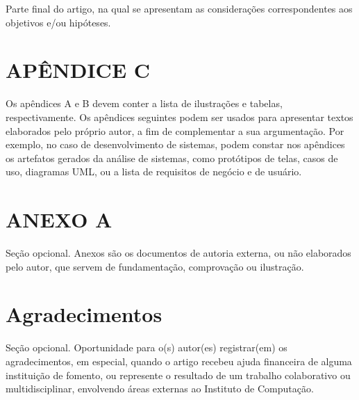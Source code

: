 \documentclass[article,a4paper,12pt,brazil,sumario=tradicional]{abntex2}
\begin{document}
Parte final do artigo, na qual se apresentam as considerações correspondentes aos objetivos e/ou hipóteses.

\newpage


\newpage
\renewcommand{\listfigurename}{APÊNDICE A - Lista de ilustrações}
\listoffigures

\newpage
\renewcommand{\listtablename}{APÊNDICE B - Lista de tabelas}
\listoftables

\begin{appendices}
\newpage
\chapter* {APÊNDICE C}
\noindent
Os apêndices A e B devem conter a lista de ilustrações e tabelas, respectivamente. Os apêndices seguintes podem ser usados para apresentar textos elaborados pelo próprio autor, a fim de complementar a sua argumentação. Por exemplo, no caso de desenvolvimento de sistemas, podem constar nos apêndices os artefatos gerados da análise de sistemas, como protótipos de telas, casos de uso, diagramas UML, ou a lista de requisitos de negócio e de usuário.

\newpage
\chapter*{ANEXO A}
\noindent
Seção opcional. Anexos são os documentos de autoria externa, ou não elaborados pelo autor, que servem de fundamentação, comprovação ou ilustração.
\end{appendices}

\newpage
\chapter*{Agradecimentos}
\noindent
Seção opcional. Oportunidade para o(s) autor(es) registrar(em) os agradecimentos, em especial, quando o artigo recebeu ajuda financeira de alguma instituição de fomento, ou represente o resultado de um trabalho colaborativo ou multidisciplinar, envolvendo áreas externas ao Instituto de Computação.
\end{document}
